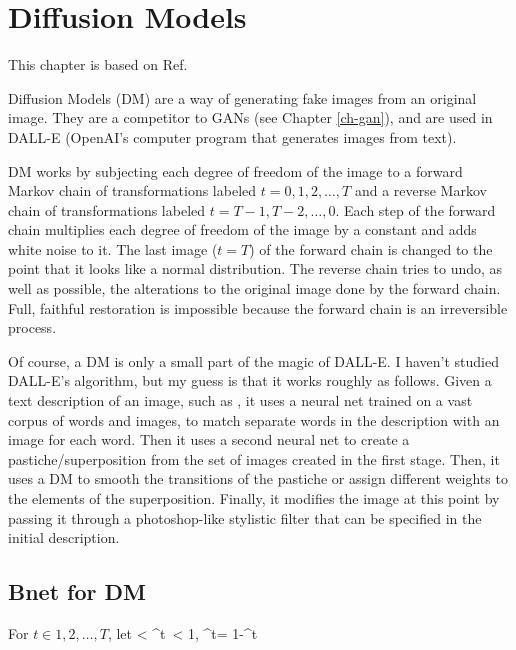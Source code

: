 \chapter{Diffusion Models}
\label{ch-diffusion}
\newcommand{\prodalp}[0]{\pi_1^t\alp}

This chapter is based on
 Ref.\cite{weng-diffusion-model}

Diffusion Models (DM)
are a way of generating 
fake images from an
original image.
They are a competitor 
to GANs (see Chapter \ref{ch-gan}),
and are used in DALL-E 
(OpenAI's 
computer program
that generates images from text).


DM works by
subjecting
each degree of freedom 
of the image 
to a forward Markov
chain
of transformations
labeled $t=0, 1, 2, \ldots, T$
and a reverse Markov
chain of transformations
labeled $t=T-1, T-2, \ldots,
0$.
Each step
of the forward chain
multiplies each degree
of freedom
of the image by a constant
and adds white noise
to it.
The last  image  ($t=T$)
of the forward chain is
changed to the
point that it looks
like a normal distribution.
The reverse chain tries
to undo,
as well as possible, the alterations
to the original image
done by the forward chain.
Full, faithful restoration
is impossible
because the
forward chain
is an irreversible 
process.

Of course, a DM
is only a small part of the magic of DALL-E. I haven't
studied DALL-E's algorithm,
but my guess is that it works roughly as follows.
Given a text description
of an image, such as  
,
it uses a neural net
trained on a vast corpus of 
words and images, to match
separate words in the description
 with an image
 for each word.
Then it uses a second neural net
to create a pastiche/superposition from
the set of images created in the first
stage. 
Then, it uses a DM
to smooth the transitions of the pastiche
or assign different
weights to the 
elements of the superposition.
Finally, it 
modifies
the image at this point
by passing it
through a 
photoshop-like stylistic filter
that can be specified
in the initial description.



\section{Bnet for DM}

For $t\in 1,2, \ldots , T$, let
< \alp^t\
< 1, \; \beta^t= 1-\alp^t
\eeq


